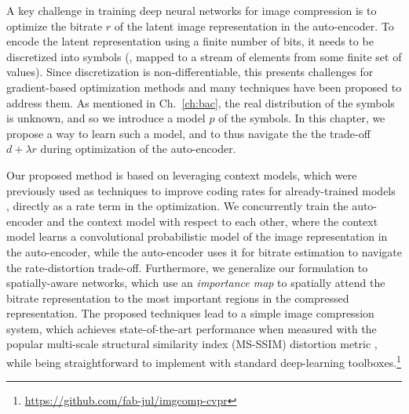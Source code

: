 A key
challenge in training deep neural networks for image compression is
to optimize the bitrate $r$ of the latent
image representation in the auto-encoder.  To encode the latent representation
using a finite number of bits, it needs to be discretized into symbols (\ie,
mapped to a stream of elements from some finite set of values).  Since
discretization is non-differentiable, this presents  challenges for
gradient-based optimization methods and many techniques have been proposed to
address them.  
As mentioned in Ch.~\ref{ch:bac}, the real
distribution of the symbols is unknown, and so we introduce a model $p$ of the
symbols.  In this chapter, we propose a way to learn such a model, and to thus
navigate the the trade-off $d+\lambda r$ during optimization of the auto-encoder.

Our proposed method is based on leveraging context models, which were
previously used as techniques to improve coding rates for already-trained
models \cite{balle2016end, toderici2016full,li2017learning,rippel17a}, directly
as a rate term in the optimization. We concurrently train the auto-encoder
and the context model with respect to each other, where the context model
learns a convolutional probabilistic model of the image representation in the
auto-encoder, while the auto-encoder uses it for bitrate estimation to navigate
the rate-distortion trade-off.  Furthermore, we generalize our formulation to
spatially-aware networks, which use an \textit{importance map} to spatially
attend the bitrate representation to the most important regions in the
compressed representation.  The proposed techniques lead to a simple image
compression system, which achieves state-of-the-art performance when measured
with the popular multi-scale structural similarity index (MS-SSIM) distortion
metric \cite{SSIM-MS}, while being straightforward to implement with standard
deep-learning
toolboxes.\footnote{\url{https://github.com/fab-jul/imgcomp-cvpr}}

